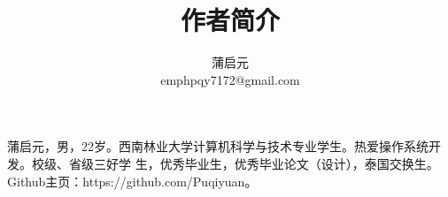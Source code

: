 \documentclass{wx672article} %
\title{作者简介}
\author{蒲启元 \\
emph{pqy7172@gmail.com}}
\begin{document}
\maketitle{}

蒲启元，男，22岁。西南林业大学计算机科学与技术专业学生。热爱操作系统开发。校级、省级三好学
生，优秀毕业生，优秀毕业论文（设计），泰国交换生。Github主页：https://github.com/Puqiyuan。
\end{document}
